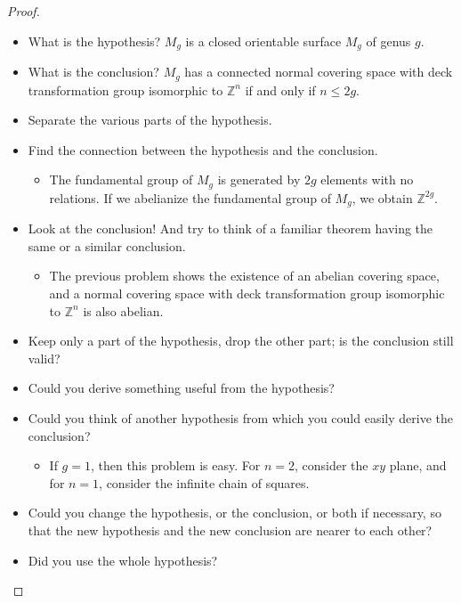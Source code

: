 \documentclass[12pt, psamsfonts]{amsart}
\theoremstyle{definition}
\theoremstyle{remark}
\numberwithin{equation}{section}
\begin{document}
\begin{proof}
  \begin{itemize}
    \item
      What is the hypothesis?
      $M_g$ is a closed orientable surface $M_g$ of genus $g$.
    \item
      What is the conclusion?
      $M_g$ has a connected normal covering space with deck transformation group isomorphic to $\mathbb{Z}^n$ if and only if $n \leq 2g$.
    \item Separate the various parts of the hypothesis.
    \item Find the connection between the hypothesis and the conclusion.
      \begin{itemize}
        \item
          The fundamental group of $M_g$ is generated by $2g$ elements with no relations.
          If we abelianize the fundamental group of $M_g$, we obtain $\mathbb{Z}^{2g}$.
      \end{itemize}
    \item Look at the conclusion! And try to think of a familiar theorem having the same or a similar conclusion.
      \begin{itemize}
        \item
          The previous problem shows the existence of an abelian covering space, and a normal covering space with deck transformation group isomorphic to $\mathbb{Z}^n$ is also abelian.
      \end{itemize}
    \item Keep only a part of the hypothesis, drop the other part; is the conclusion still valid?
    \item Could you derive something useful from the hypothesis?
    \item Could you think of another hypothesis from which you could easily derive the conclusion?
      \begin{itemize}
        \item
          If $g = 1$, then this problem is easy.
          For $n = 2$, consider the $xy$ plane, and for $n = 1$, consider the infinite chain of squares.
      \end{itemize}
    \item Could you change the hypothesis, or the conclusion, or both if necessary, so that the new hypothesis and the new conclusion are nearer to each other?
    \item Did you use the whole hypothesis?
  \end{itemize}
\end{proof}
\end{document}
